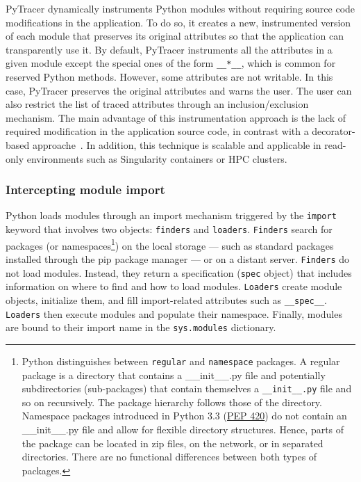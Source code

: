 \documentclass[10pt,journal,compsoc]{IEEEtran}
\newcommand{\pytracer}[0]{PyTracer\xspace}
\DeclareRobustCommand{\add}[1]{#1}
\DeclareRobustCommand{\remove}[1]{}
\begin{document}
\pytracer dynamically instruments Python modules without requiring source code
modifications in the application. To do so, it creates a new, instrumented
version of each module that preserves its original attributes so that the
application can transparently use it.
By default, \pytracer instruments all the attributes in a given module except
the special ones of the form \texttt{\_\_*\_\_}, which is common for reserved
Python methods. However, some attributes are not writable. In this case,
\pytracer \remove{preservers} \add{preserves} the original attributes and warns
the user. The user can also restrict the list of traced attributes through an
inclusion/exclusion mechanism. The main advantage of this instrumentation
approach is the lack of required modification in the application source code, in
contrast with \remove{decorator-based approaches} \add{a decorator-based
    approache~\mbox{\cite{hunt2019decorators}}}. In addition, this technique is
scalable and applicable in read-only environments such as Singularity containers
or HPC clusters.





\subsubsection{Intercepting module import}

Python loads modules through an import mechanism triggered by the
\texttt{import} keyword that involves two objects: \texttt{finders} and
\texttt{loaders}. \texttt{Finders} search for packages (or
namespaces\footnote{Python distinguishes between \texttt{regular} and
    \texttt{namespace} packages. A regular package is a directory that contains a
    \_\_init\_\_.py file and potentially subdirectories (sub-packages) that contain
    themselves a \texttt{\_\_init\_\_.py} file and so on recursively. The package
    hierarchy follows those of the directory. Namespace packages introduced in
    Python 3.3 (\href{https://www.python.org/dev/peps/pep-0420/}{PEP 420}) do not
    contain an \_\_init\_\_.py file and allow for flexible directory structures.
    Hence, parts of the package can be located in zip files, on the network, or in
    separated directories. There are no functional differences between both types of
    packages.}) on the local storage --- such as standard packages installed through
the pip package manager --- or on a distant server. \texttt{Finders} do not load
modules. Instead, they return a specification (\texttt{spec} object) that
includes information on where to find and how to load modules. \texttt{Loaders}
create module objects, initialize them, and fill import-related attributes such
as \texttt{\_\_spec\_\_}. \texttt{Loaders} then execute modules and populate
their namespace. Finally, modules are bound to their import name in the
\texttt{sys.modules} dictionary.
\end{document}
